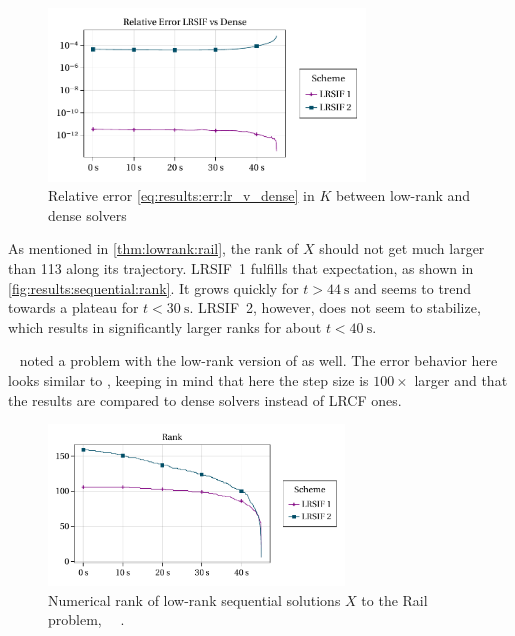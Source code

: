 \begin{figure}[tp]
  \centering
  \includegraphics[width=0.75\textwidth]{figures/fig_results_sequential_err.pdf}
  \caption[Relative error between low-rank and dense solvers]{%
    Relative error \eqref{eq:results:err:lr_v_dense} in $K$ between low-rank and dense solvers
  }
  \label{fig:results:sequential:err}
\end{figure}

As mentioned in \autoref{thm:lowrank:rail},
the rank of $X$ should not get much larger than 113 along its trajectory.
\ac{LRSIF}~1 fulfills that expectation, as shown in \autoref{fig:results:sequential:rank}.
It grows quickly for $t > \SI{44}{\second}$ and seems to trend towards a plateau for $t< \SI{30}{\second}$.
\ac{LRSIF}~2, however, does not seem to stabilize,
which results in significantly larger ranks for about $t < \SI{40}{\second}$.

\begin{remark}
  \citeauthor{Lang2015}~\cite[63]{Lang2015} noted a problem with the low-rank version of  as well.
  The error behavior here looks similar to \cite[Fig.~1]{Lang2015},
  keeping in mind that here the step size is $100\times$ larger
  and that the results are compared to dense solvers instead of \ac{LRCF} ones.
\end{remark}

\begin{figure}[tp]
  \centering
  \includegraphics[width=0.7\textwidth]{figures/fig_results_sequential_rank.pdf}
  \caption[Numerical rank of low-rank sequential solutions to Rail problem]{%
    Numerical rank of low-rank sequential solutions $X$ to the Rail problem,
    \cf~\citeauthor{Lang2017}~\cite[Figure~6.6b]{Lang2017}.
  }
  \label{fig:results:sequential:rank}
\end{figure}

